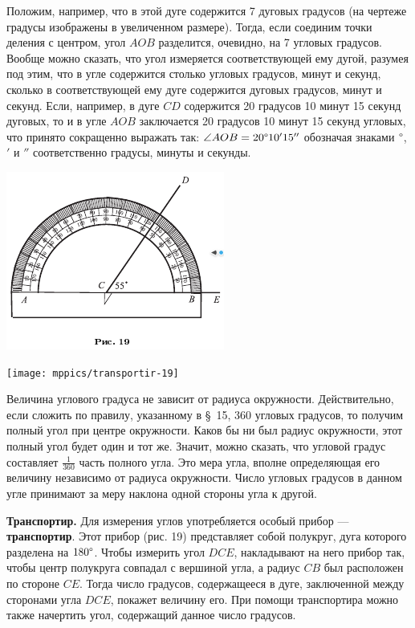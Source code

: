 \documentclass[oneside]{book}
\begin{document}
Положим, например, что в этой дуге содержится 7 дуговых градусов (на чертеже градусы изображены в увеличенном размере).
Тогда, если соединим точки деления с центром, угол $AOB$ разделится, очевидно, на 7 угловых градусов.
Вообще можно сказать, что угол измеряется соответствующей ему дугой, разумея под этим, что в угле содержится столько угловых градусов, минут и секунд, сколько в соответствующей ему дуге содержится дуговых градусов, минут и секунд.
Если, например, в дуге $CD$ содержится 20 градусов 10 минут 15 секунд дуговых, то и в угле $AOB$ заключается 20 градусов 10 минут 15 секунд угловых, что принято сокращенно выражать так:
$\angle AOB = 20\degree 10'15''$ обозначая знаками $\degree $, $'$ и $''$ соответственно градусы, минуты и секунды.

\includegraphics{pics/ris-19}

\texttt{[image: mppics/transportir-19]}

Величина углового градуса не зависит от радиуса окружности.
Действительно, если сложить по правилу, указанному в §~15, 360 угловых градусов, то получим полный угол при центре окружности.
Каков бы ни был радиус окружности, этот полный угол будет один и тот же.
Значит, можно сказать, что угловой градус составляет $\tfrac1{360}$ часть полного угла.
Это мера угла, вполне определяющая его величину независимо от радиуса окружности.
Число угловых градусов в данном угле принимают за меру наклона одной стороны угла к другой.

\textbf{Транспортир.}
Для измерения углов употребляется особый прибор — \textbf{транспортир}.
Этот прибор (рис. 19) представляет собой полукруг, дуга которого разделена на $180\degree $.
Чтобы измерить угол $DCE$, накладывают на него прибор так, чтобы центр полукруга совпадал с вершиной угла, а радиус $CB$ был расположен по стороне $CE$.
Тогда число градусов, содержащееся в дуге, заключенной между сторонами угла $DCE$, покажет величину его.
При помощи транспортира можно также начертить угол, содержащий данное число градусов.
\end{document}
